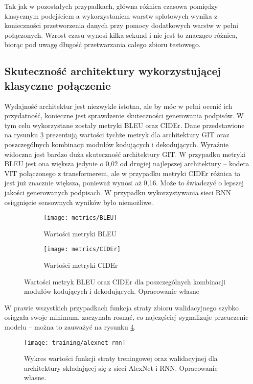 \noindent Tak jak w pozostałych przypadkach, główna różnica czasowa pomiędzy klasycznym podejściem a wykorzystaniem warstw splotowych wynika z konieczności przetworzenia danych przy pomocy dodatkowych warstw w pełni połączonych. Wzrost czasu wynosi kilka sekund i nie jest to znacząco różnica, biorąc pod uwagę długość przetwarzania całego zbioru testowego.
\subsection{Skuteczność architektury wykorzystującej klasyczne połączenie}
Wydajność architektur jest niezwykle istotna, ale by móc w pełni ocenić ich przydatność, konieczne jest sprawdzenie skuteczności generowania podpisów. W tym celu wykorzystane zostały metryki BLEU oraz CIDEr. Dane przedstawione na rysunku \ref{fig:metrics} prezentują wartości tychże metryk dla architektury GIT oraz poszczególnych kombinacji modułów kodujących i dekodujących. Wyraźnie widoczna jest bardzo duża skuteczność architektury GIT. W przypadku metryki BLEU jest ona większa jedynie o 0,02 od drugiej najlepszej architektury -- kodera VIT połączonego z transformerem, ale w przypadku metryki CIDEr różnica ta jest już znacznie większa, ponieważ wynosi aż 0,16. Może to świadczyć o lepszej jakości generowanych podpisach. W przypadku wykorzystywania sieci RNN osiągnięcie sensownych wyników było niemożliwe.
\begin{figure}[H]
    \centering
    \begin{subfigure}{.5\textwidth}
        \centering
        \texttt{[image: metrics/BLEU]}
        \caption{Wartości metryki BLEU}
        \label{fig:bleu}
    \end{subfigure}%
    \centering
    \begin{subfigure}{.5\textwidth}
        \centering
        \texttt{[image: metrics/CIDEr]}
        \caption{Wartości metryki CIDEr}
        \label{fig:cider}
    \end{subfigure}%
    \caption{Wartości metryk BLEU oraz CIDEr dla poszczególnych kombinacji modułów kodujących i dekodujących. Opracowanie własne}
    \label{fig:metrics}
\end{figure}
\noindent W prawie wszystkich przypadkach funkcja straty zbioru walidacyjnego szybko osiągała swoje minimum, zaczynała rosnąć, co najczęściej sygnalizuje przeuczenie modelu -- można to zauważyć na rysunku \ref{fig:training-alexnet-rnn}.
\begin{figure}[H]
    \centering
    \texttt{[image: training/alexnet\_rnn]}
    \caption{Wykres wartości funkcji straty treningowej oraz walidacyjnej dla architektury składającej się z sieci AlexNet i RNN. Opracowanie własne.}
    \label{fig:training-alexnet-rnn}
\end{figure}
